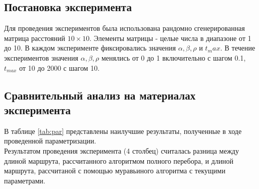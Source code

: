 \documentclass[a4paper, 14pt]{article}
\begin{document}
	\subsection{Постановка эксперимента}
	
	Для проведения экспериментов была использована рандомно сгенерированная матрица расстояний $10\times10$. Элементы матрицы - целые числа в диапазоне от 1 до 10. В каждом эксперименте фиксировались значения $\alpha, \beta, \rho$ и $t_max$. В течение экспериментов значения $\alpha, \beta, \rho$ менялись от 0 до 1 включительно с шагом 0.1, $t_{max}$ от 10 до 2000 с шагом 10. \\

	
	\subsection{Сравнительный анализ на материалах эксперимента}
	
	В таблице \ref{tab:par} представлены наилучшие результаты, полученные в ходе проведенной параметризации.\\
	
		Результатом проведения эксперимента (4 столбец) считалась разница между длиной маршрута, рассчитанного алгоритмом полного перебора, и длиной маршрута, рассчитаной с помощью муравьиного алгоритма с текущими параметрами. 
	
\end{document}
